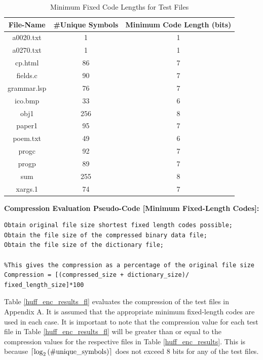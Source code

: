 \documentclass[12pt]{article}
\DeclarePairedDelimiter{\ceil}{\lceil}{\rceil}
\begin{document}
\begin{table}[H]
	\centering
	\begin{tabular}{| c | c | c | } 
		\hline
		File-Name & \#Unique Symbols & Minimum Code Length (bits) \\
		\hline
		a0020.txt & 1 & 1\\
		\hline
		a0270.txt & 1 & 1\\
		\hline
		cp.html & 86 & 7\\
		\hline
		fields.c & 90 & 7\\
		\hline
		grammar.lsp & 76 & 7\\
		\hline
		ico.bmp & 33 & 6\\
		\hline
		obj1 & 256 & 8\\
		\hline
		paper1 & 95 & 7\\
		\hline
		poem.txt & 49 & 6\\
		\hline
		progc & 92 & 7\\
		\hline
		progp & 89 & 7\\
		\hline
		sum & 255 & 8\\
		\hline
		xargs.1 & 74 & 7\\
		\hline
	\end{tabular}
	\caption{Minimum Fixed Code Lengths for Test Files}
	\label{test_file_code_lengths}
\end{table}
\hfill\linebreak\textbf{Compression Evaluation Pseudo-Code [Minimum Fixed-Length Codes]:}
\begin{verbatim}
Obtain original file size shortest fixed length codes possible;
Obtain the file size of the compressed binary data file;
Obtain the file size of the dictionary file;

%This gives the compression as a percentage of the original file size
Compression = [(compressed_size + dictionary_size)/ fixed_length_size]*100
\end{verbatim}

Table \ref{huff_enc_results_fl} evaluates the compression of the test files in Appendix A. It is assumed that the appropriate minimum fixed-length codes are used in each case. It is important to note that the compression value for each test file in Table \ref{huff_enc_results_fl} will be greater than or equal to the compression values for the respective files in Table \ref{huff_enc_results}. This is because $\ceil{\log_2{\text{(\#unique\_symbols)}}}$ does not exceed 8 bits for any of the test files. 
\end{document}

